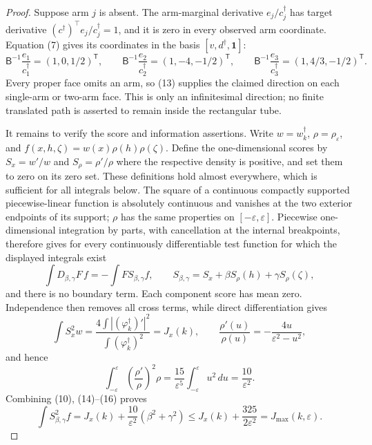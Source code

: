 \documentclass{article}
\begin{document}
{\begin{proof}
Suppose arm \(j\) is absent.  The arm-marginal derivative \(e_j/c_j^\dagger\)
has target derivative \((c^\dagger)^\top e_j/c_j^\dagger=1\), and it is zero in
every observed arm coordinate.  Equation (7) gives its coordinates in the basis
\([v,d^\dagger,\mathbf1]\):
\[
 \mathsf B^{-1}\frac{e_1}{c_1^\dagger}=(1,0,1/2)^{\mathsf T},\qquad
 \mathsf B^{-1}\frac{e_2}{c_2^\dagger}=(1,-4,-1/2)^{\mathsf T},\qquad
 \mathsf B^{-1}\frac{e_3}{c_3^\dagger}=(1,4/3,-1/2)^{\mathsf T}.
\tag{13}
\]
Every proper face omits an arm, so (13) supplies the claimed direction on each
single-arm or two-arm face.  This is only an infinitesimal direction; no finite
translated path is asserted to remain inside the rectangular tube.

It remains to verify the score and information assertions.  Write
\(w=w_k^\dagger\), \(\rho=\rho_\varepsilon\), and
\(f(x,h,\zeta)=w(x)\rho(h)\rho(\zeta)\).  Define the one-dimensional scores by
\(S_x=w'/w\) and \(S_\rho=\rho'/\rho\) where the respective density is positive,
and set them to zero on its zero set.  These definitions hold almost everywhere,
which is sufficient for all integrals below.  The square of a continuous compactly
supported piecewise-linear function is absolutely continuous and vanishes at the
two exterior endpoints of its support; \(\rho\) has the same properties on
\([-\varepsilon,\varepsilon]\).  Piecewise one-dimensional integration by parts,
with cancellation at the internal breakpoints, therefore gives for every
continuously differentiable test function for which the displayed integrals exist
\[
 \int D_{\beta,\gamma}F\,f
 =-\int F S_{\beta,\gamma}f,
 \qquad
 S_{\beta,\gamma}=S_x+\beta S_\rho(h)+\gamma S_\rho(\zeta),
\tag{14}
\]
and there is no boundary term.  Each component score has mean zero.  Independence
then removes all cross terms, while direct differentiation gives
\[
 \int S_x^2w
 =\frac{4\int| (\varphi_k^\dagger)'|^2}
 {\int(\varphi_k^\dagger)^2}=J_x(k),
 \qquad
 \frac{\rho'(u)}{\rho(u)}=-\frac{4u}{\varepsilon^2-u^2},
\tag{15}
\]
and hence
\[
 \int_{-\varepsilon}^{\varepsilon}
 \left(\frac{\rho'}{\rho}\right)^2\rho
 =\frac{15}{\varepsilon^5}
 \int_{-\varepsilon}^{\varepsilon}u^2\,du
 =\frac{10}{\varepsilon^2}.
\tag{16}
\]
Combining (10), (14)--(16) proves
\[
 \int S_{\beta,\gamma}^2f
 =J_x(k)+\frac{10}{\varepsilon^2}(\beta^2+\gamma^2)
 \le J_x(k)+\frac{325}{2\varepsilon^2}
 =J_{\max}(k,\varepsilon).
\tag{17}
\]


\end{proof}}
\end{document}
